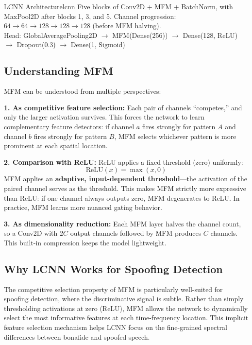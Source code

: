 \documentclass[12pt]{report}
\begin{document}
\begin{tecbox}{LCNN Architecture}{lcnn}
    Five blocks of Conv2D + MFM + BatchNorm, with MaxPool2D after blocks 1, 3, and 5.
    Channel progression: $64 \to 64 \to 128 \to 128 \to 128$ (before MFM halving). \\
    Head: GlobalAveragePooling2D $\to$ MFM(Dense(256)) $\to$ Dense(128, ReLU) $\to$
    Dropout(0.3) $\to$ Dense(1, Sigmoid)
\end{tecbox}

\subsection{Understanding MFM}

MFM can be understood from multiple perspectives:

\textbf{1. As competitive feature selection:}
Each pair of channels ``competes,'' and only the larger activation survives. This forces the
network to learn complementary feature detectors: if channel $a$ fires strongly for pattern
$A$ and channel $b$ fires strongly for pattern $B$, MFM selects whichever pattern is more
prominent at each spatial location.

\textbf{2. Comparison with ReLU:}
ReLU applies a fixed threshold (zero) uniformly:
\begin{equation}
    \text{ReLU}(x) = \max(x, 0)
\end{equation}
MFM applies an \textbf{adaptive, input-dependent threshold}---the activation of the paired
channel serves as the threshold. This makes MFM strictly more expressive than ReLU: if one
channel always outputs zero, MFM degenerates to ReLU. In practice, MFM learns more nuanced
gating behavior.

\textbf{3. As dimensionality reduction:}
Each MFM layer halves the channel count, so a Conv2D with $2C$ output channels followed by
MFM produces $C$ channels. This built-in compression keeps the model lightweight.

\subsection{Why LCNN Works for Spoofing Detection}

The competitive selection property of MFM is particularly well-suited for spoofing detection,
where the discriminative signal is subtle. Rather than simply thresholding activations at zero
(ReLU), MFM allows the network to dynamically select the most informative features at each
time-frequency location. This implicit feature selection mechanism helps LCNN focus on the
fine-grained spectral differences between bonafide and spoofed speech.
\end{document}
